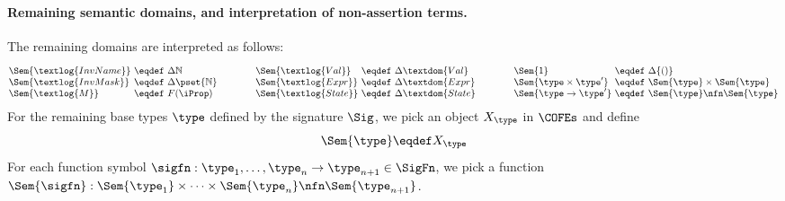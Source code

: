 \paragraph{Remaining semantic domains, and interpretation of non-assertion terms.}

The remaining domains are interpreted as follows:
\[
\begin{array}[t]{@{}l@{\ }c@{\ }l@{}}
\Sem{\textlog{InvName}} &\eqdef& \Delta \mathbb{N}  \\
\Sem{\textlog{InvMask}} &\eqdef& \Delta \pset{\mathbb{N}} \\
\Sem{\textlog{M}} &\eqdef& F(\iProp)
\end{array}
\qquad\qquad
\begin{array}[t]{@{}l@{\ }c@{\ }l@{}}
\Sem{\textlog{Val}} &\eqdef& \Delta \textdom{Val} \\
\Sem{\textlog{Expr}} &\eqdef& \Delta \textdom{Expr} \\
\Sem{\textlog{State}} &\eqdef& \Delta \textdom{State} \\
\end{array}
\qquad\qquad
\begin{array}[t]{@{}l@{\ }c@{\ }l@{}}
\Sem{1} &\eqdef& \Delta \{ () \} \\
\Sem{\type \times \type'} &\eqdef& \Sem{\type} \times \Sem{\type} \\
\Sem{\type \to \type'} &\eqdef& \Sem{\type} \nfn \Sem{\type} \\
\end{array}
\]
For the remaining base types $\type$ defined by the signature $\Sig$, we pick an object $X_\type$ in $\COFEs$ and define
\[
\Sem{\type} \eqdef X_\type
\]
For each function symbol $\sigfn : \type_1, \dots, \type_n \to \type_{n+1} \in \SigFn$, we pick a function $\Sem{\sigfn} : \Sem{\type_1} \times \dots \times \Sem{\type_n} \nfn \Sem{\type_{n+1}}$.

